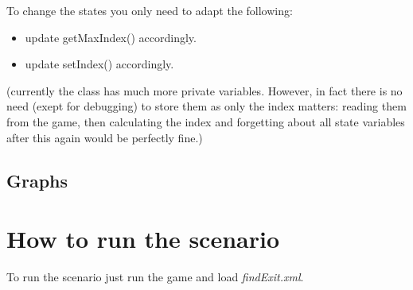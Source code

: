 \documentclass[a4paper,10pt]{scrartcl}
\begin{document}
To change the states you only need to adapt the following:
\begin{itemize}
 \item update getMaxIndex() accordingly.
 \item update setIndex() accordingly.
\end{itemize}

(currently the class has much more private variables. However, in fact there is no need (exept for debugging) to store them as only the index matters: reading them from the game, then calculating the index and forgetting about all state variables after this again would be perfectly fine.)

\subsection{Graphs}


\section{How to run the scenario}

To run the scenario just run the game and load \textit{findExit.xml}. 
\end{document}
